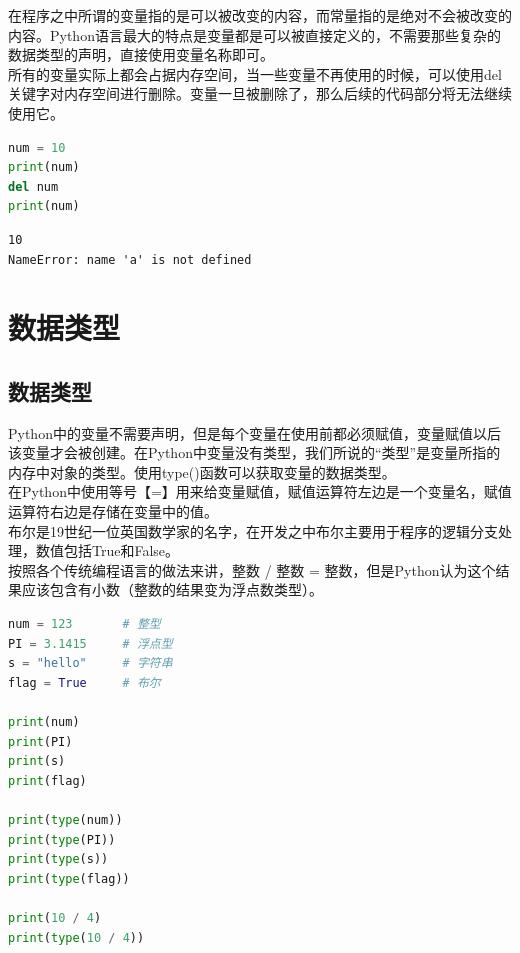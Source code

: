 在程序之中所谓的变量指的是可以被改变的内容，而常量指的是绝对不会被改变的内容。Python语言最大的特点是变量都是可以被直接定义的，不需要那些复杂的数据类型的声明，直接使用变量名称即可。\\

所有的变量实际上都会占据内存空间，当一些变量不再使用的时候，可以使用del关键字对内存空间进行删除。变量一旦被删除了，那么后续的代码部分将无法继续使用它。\\


\begin{lstlisting}[language=Python]
num = 10
print(num)
del num
print(num)
\end{lstlisting}

\begin{tcolorbox}
	\begin{verbatim}
10
NameError: name 'a' is not defined
	\end{verbatim}
\end{tcolorbox}

\newpage

\section{数据类型}

\subsection{数据类型}

Python中的变量不需要声明，但是每个变量在使用前都必须赋值，变量赋值以后该变量才会被创建。在Python中变量没有类型，我们所说的“类型”是变量所指的内存中对象的类型。使用type()函数可以获取变量的数据类型。\\

在Python中使用等号【=】用来给变量赋值，赋值运算符左边是一个变量名，赋值运算符右边是存储在变量中的值。\\

布尔是19世纪一位英国数学家的名字，在开发之中布尔主要用于程序的逻辑分支处理，数值包括True和False。\\

按照各个传统编程语言的做法来讲，整数 / 整数 = 整数，但是Python认为这个结果应该包含有小数（整数的结果变为浮点数类型）。\\


\begin{lstlisting}[language=Python]
num = 123		# 整型
PI = 3.1415		# 浮点型
s = "hello"		# 字符串
flag = True		# 布尔

print(num)
print(PI)
print(s)
print(flag)

print(type(num))
print(type(PI))
print(type(s))
print(type(flag))

print(10 / 4)
print(type(10 / 4))
\end{lstlisting}

